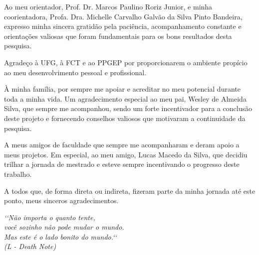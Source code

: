 \imprimircapa
\imprimirfolhaderosto
\imprimirTECA
\imprimirFichacatalografica
\imprimirAtaDeDefesa




\begin{agradecimentos}

    Ao meu orientador, Prof. Dr. Marcos Paulino Roriz Junior, e minha coorientadora, Profa. Dra. Michelle Carvalho Galvão da Silva Pinto Bandeira, expresso minha sincera gratidão pela paciência, acompanhamento constante e orientações valiosas que foram fundamentais para os bons resultados desta pesquisa.
    
    Agradeço à UFG, à FCT e ao PPGEP por proporcionarem o ambiente propício ao meu desenvolvimento pessoal e profissional.

    À minha família, por sempre me apoiar e acreditar no meu potencial durante toda a minha vida. Um agradecimento especial ao meu pai, Wesley de Almeida Silva, que sempre me acompanhou, sendo um forte incentivador para a conclusão deste projeto e fornecendo conselhos valiosos que motivaram a continuidade da pesquisa.

    A meus amigos de faculdade que sempre me acompanharam e deram apoio a meus projetos. Em especial, ao meu amigo, Lucas Macedo da Silva, que decidiu trilhar a jornada de mestrado e esteve sempre incentivando o progresso deste trabalho.

    A todos que, de forma direta ou indireta, fizeram parte da minha jornada até este ponto, meus sinceros agradecimentos.
  

\end{agradecimentos}


\begin{epigrafe}
    \vspace*{\fill}
    \begin{flushright}
        \textit{‘‘Não importa o quanto tente, \\ você sozinho não pode mudar o mundo.\\  Mas este é o lado bonito do mundo.‘‘\\
        (L - Death Note)}
    \end{flushright}
\end{epigrafe}



